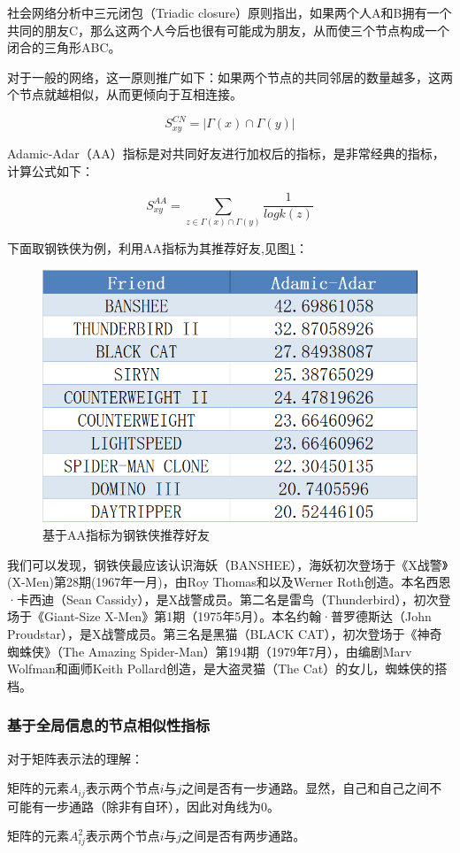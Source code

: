 \documentclass[12pt]{xjtureport}
\begin{document}
社会网络分析中三元闭包（Triadic closure）原则指出，如果两个人A和B拥有一个共同的朋友C，那么这两个人今后也很有可能成为朋友，从而使三个节点构成一个闭合的三角形ABC。

对于一般的网络，这一原则推广如下：如果两个节点的共同邻居的数量越多，这两个节点就越相似，从而更倾向于互相连接。

$$S_{xy}^{CN} = |\Gamma(x) \cap \Gamma(y)|$$

Adamic-Adar（AA）指标是对共同好友进行加权后的指标，是非常经典的指标，计算公式如下：

$$S_{xy}^{AA} = \sum_{z \in \Gamma(x) \cap \Gamma(y)}\frac{1}{log k(z)}$$

下面取钢铁侠为例，利用AA指标为其推荐好友,见图\ref{friend1}：

\begin{figure}[!htbp]
    \centering
    \includegraphics[width=0.5\linewidth]{figures/钢铁侠推荐好友.jpg}
    \caption{基于AA指标为钢铁侠推荐好友}
    \label{friend1}
\end{figure}

我们可以发现，钢铁侠最应该认识海妖（BANSHEE），海妖初次登场于《X战警》(X-Men)第28期(1967年一月)，由Roy Thomas和以及Werner Roth创造。本名西恩·卡西迪（Sean Cassidy），是X战警成员。第二名是雷鸟（Thunderbird），初次登场于《Giant-Size X-Men》第1期（1975年5月）。本名约翰·普罗德斯达（John Proudstar），是X战警成员。第三名是黑猫（BLACK CAT），初次登场于《神奇蜘蛛侠》（The Amazing Spider-Man）第194期（1979年7月），由编剧Marv Wolfman和画师Keith Pollard创造，是大盗灵猫（The Cat）的女儿，蜘蛛侠的搭档。

\subsubsection{基于全局信息的节点相似性指标}

对于矩阵表示法的理解：

矩阵的元素$A_{ij}$表示两个节点$i$与$j$之间是否有一步通路。显然，自己和自己之间不可能有一步通路（除非有自环），因此对角线为0。

矩阵的元素$A_{ij}^{2}$表示两个节点$i$与$j$之间是否有两步通路。
\end{document}
